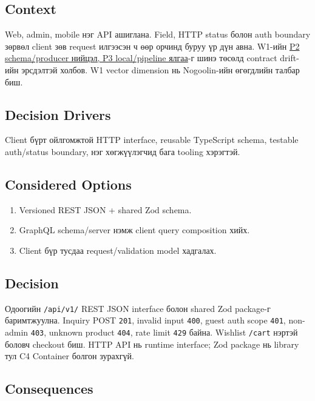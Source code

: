 \documentclass[
  mongolian,
]{article}
\providecommand{\tightlist}{%
  \setlength{\itemsep}{0pt}\setlength{\parskip}{0pt}}
\begin{document}
\subsection{Context}\label{context-2}

Web, admin, mobile нэг API ашиглана. Field, HTTP status болон auth
boundary зөрвөл client зөв request илгээсэн ч өөр орчинд буруу үр дүн
авна. W1-ийн
\href{https://github.com/Tengis01/Nogoolin/blob/main/docs/ICSI438/sem1/wiki/02_audience_persona.md}{P2
schema/producer нийцэл, P3 local/pipeline ялгаа}-г шинэ төсөлд contract
drift-ийн эрсдэлтэй холбов. W1 vector dimension нь Nogoolin-ийн
өгөгдлийн талбар биш.

\subsection{Decision Drivers}\label{decision-drivers-2}

Client бүрт ойлгомжтой HTTP interface, reusable TypeScript schema,
testable auth/status boundary, нэг хөгжүүлэгчид бага tooling хэрэгтэй.

\subsection{Considered Options}\label{considered-options-2}

\begin{enumerate}
\def\labelenumi{\arabic{enumi}.}
\tightlist
\item
  Versioned REST JSON + shared Zod schema.
\item
  GraphQL schema/server нэмж client query composition хийх.
\item
  Client бүр тусдаа request/validation model хадгалах.
\end{enumerate}

\subsection{Decision}\label{decision-2}

Одоогийн \texttt{/api/v1/} REST JSON interface болон shared Zod
package-г баримтжуулна. Inquiry POST \texttt{201}, invalid input
\texttt{400}, guest auth scope \texttt{401}, non-admin \texttt{403},
unknown product \texttt{404}, rate limit \texttt{429} байна. Wishlist
\texttt{/cart} нэртэй боловч checkout биш. HTTP API нь runtime
interface; Zod package нь library тул C4 Container болгон зурахгүй.

\subsection{Consequences}\label{consequences-2}
\end{document}
